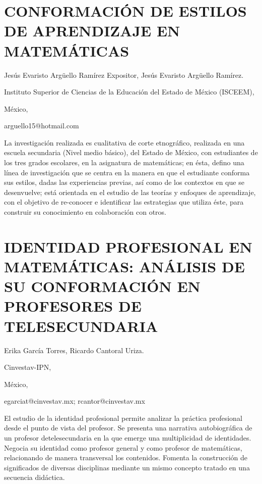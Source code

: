 \section{CONFORMACIÓN DE ESTILOS DE APRENDIZAJE EN MATEMÁTICAS}

\begin{datos}

Jesús Evaristo Argüello Ramírez Expositor, Jesús Evaristo Argüello
Ramírez.

Instituto Superior de Ciencias de la Educación del Estado de México
(ISCEEM),

México,

arguello15@hotmail.com 

\end{datos}

La investigación realizada es cualitativa de corte etnográfico, realizada
en una escuela secundaria (Nivel medio básico), del Estado de México,
con estudiantes de los tres grados escolares, en la asignatura de
matemáticas; en ésta, defino una línea de investigación que se centra
en la manera en que el estudiante conforma sus estilos, dadas las
experiencias previas, así como de los contextos en que se desenvuelve;
está orientada en el estudio de las teorías y enfoques de aprendizaje,
con el objetivo de re-conocer e identificar las estrategias que utiliza
éste, para construir su conocimiento en colaboración con otros. 


\section{IDENTIDAD PROFESIONAL EN MATEMÁTICAS: ANÁLISIS DE SU CONFORMACIÓN
EN PROFESORES DE TELESECUNDARIA}

\begin{datos}

Erika García Torres, Ricardo Cantoral Uriza.

Cinvestav-IPN,

México,

egarciat@cinvestav.mx; rcantor@cinvestav.mx

\end{datos}

El estudio de la identidad profesional permite analizar la práctica
profesional desde el punto de vista del profesor. Se presenta una
narrativa autobiográfica de un profesor detelesecundaria en la que
emerge una multiplicidad de identidades. Negocia su identidad como
profesor general y como profesor de matemáticas, relacionando de manera
transversal los contenidos. Fomenta la construcción de significados
de diversas disciplinas mediante un mismo concepto tratado en una
secuencia didáctica.


